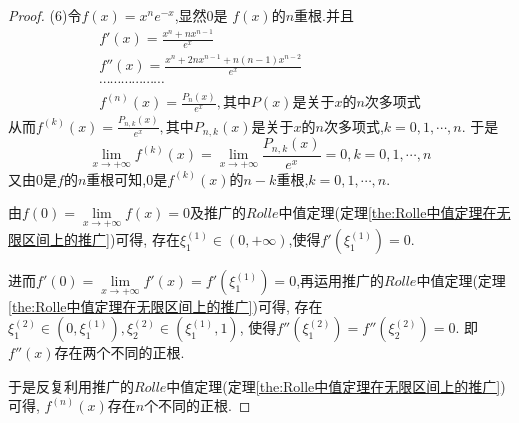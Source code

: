 \documentclass[lang=cn,newtx,10pt,scheme=chinese]{../Template/elegantbook}
\begin{document}
\begin{exercise}
\begin{proof}
    (6)令$f\left( x \right) =x^ne^{-x}$,显然$0$是
    $f(x)$的$n$重根.并且
    \begin{gather}
            f'\left( x \right) =\frac{x^n+nx^{n-1}}{e^x}
            \nonumber\\
f''\left( x \right) =\frac{x^n+2nx^{n-1}+n\left( n-1 \right) x^{n-2}}{e^x}
\nonumber\\
\cdots \cdots \cdots \cdots \cdots \cdots 
\nonumber\\
f^{\left( n \right)}\left( x \right) =\frac{P_n\left( x \right)}{e^x},\text{其中}P\left( x \right) \text{是关于}x\text{的}n\text{次多项式}
\nonumber
    \end{gather}
    从而$f^{\left( k \right)}\left( x \right) =\frac{P_{n,k}\left( x \right)}{e^x},\text{其中}P_{n,k}\left( x \right) \text{是关于}x\text{的}n\text{次多项式}$,$k=0,1,\cdots,n$.
    于是
    \begin{equation}
        \underset{x\rightarrow +\infty}{\lim}f^{\left( k \right)}\left( x \right) =\underset{x\rightarrow +\infty}{\lim}\frac{P_{n,k}\left( x \right)}{e^x}=0,k=0,1,\cdots ,n
        \nonumber
    \end{equation}
    又由0是$f$的$n$重根可知,$0$是$f^{\left( k \right)}\left( x \right)$的$n-k$重根,$k=0,1,\cdots,n$.

    由$f\left( 0 \right) =\underset{x\rightarrow +\infty}{\lim}f\left( x \right) =0$及推广的$Rolle$中值定理(定理\ref{the:Rolle中值定理在无限区间上的推广})可得,
    存在$\xi _{1}^{\left( 1 \right)}\in(0,+\infty)$,使得$f'(\xi _{1}^{\left( 1 \right)})=0$.
    
    进而$f'\left( 0 \right) =\underset{x\rightarrow +\infty}{\lim}f'\left( x \right) =f'\left( \xi _{1}^{\left( 1 \right)} \right) =0$,再运用推广的$Rolle$中值定理(定理\ref{the:Rolle中值定理在无限区间上的推广})可得,
    存在$\xi _{1}^{\left( 2 \right)}\in \left( 0,\xi _{1}^{\left( 1 \right)} \right) ,\xi _{2}^{\left( 2 \right)}\in \left( \xi _{1}^{\left( 1 \right)},1 \right) $,
    使得$f''\left( \xi _{1}^{\left( 2 \right)} \right) =f''\left( \xi _{2}^{\left( 2 \right)} \right) =0$.
    即$f''(x)$存在两个不同的正根.

    于是反复利用推广的$Rolle$中值定理(定理\ref{the:Rolle中值定理在无限区间上的推广})可得,
    $f^{(n)}(x)$存在$n$个不同的正根.


\end{proof}
\end{exercise}
\end{document}
